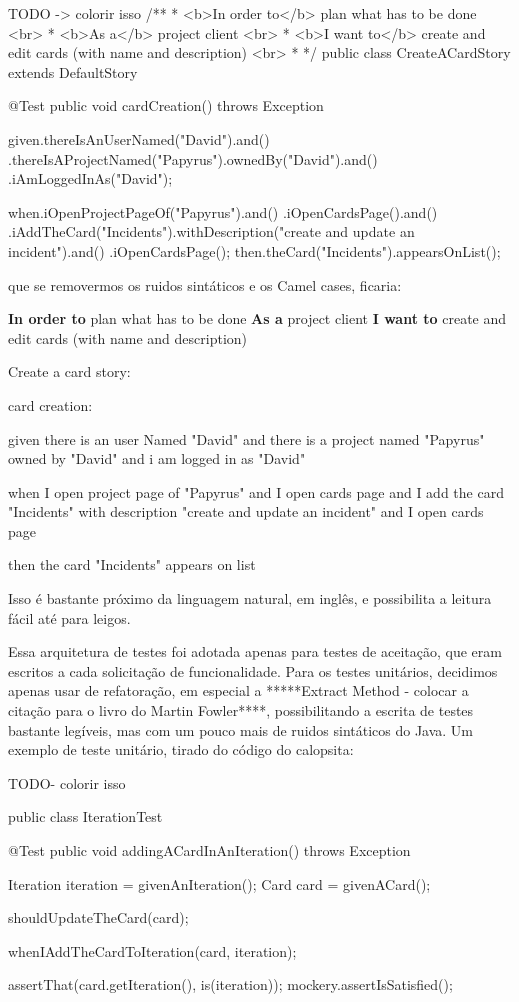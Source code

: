 TODO -> colorir isso
/**
 * <b>In order to</b> plan what has to be done <br>
 * <b>As a</b> project client <br>
 * <b>I want to</b> create and edit cards (with name and description) <br>
 *
 */
public class CreateACardStory extends DefaultStory {

	@Test
	public void cardCreation() throws Exception {
		given.thereIsAnUserNamed("David").and()
			.thereIsAProjectNamed("Papyrus").ownedBy("David").and()
			.iAmLoggedInAs("David");

		when.iOpenProjectPageOf("Papyrus").and()
		    .iOpenCardsPage().and()
			.iAddTheCard("Incidents").withDescription("create and update an incident").and()
			.iOpenCardsPage();
		then.theCard("Incidents").appearsOnList();
	}
}

que se removermos os ruidos sintáticos e os Camel cases, ficaria:

{\bf In order to} plan what has to be done
{\bf As a} project client
{\bf I want to} create and edit cards (with name and description)

Create a card story:

card creation:
	
		given there is an user Named "David" and
			there is a project named "Papyrus" owned by "David" and
			i am logged in as "David"

		when I open project page of "Papyrus" and
		  I open cards page and
			I add the card "Incidents" with description "create and update an incident" and
			I open cards page
			
		then the card "Incidents" appears on list

Isso é bastante próximo da linguagem natural, em inglês, e possibilita a leitura fácil até para leigos.

Essa arquitetura de testes foi adotada apenas para testes de aceitação, que eram escritos a cada solicitação de
funcionalidade. Para os testes unitários, decidimos apenas usar de refatoração, em especial a 
*****Extract Method - colocar a citação para o livro do Martin Fowler****, possibilitando a escrita de testes bastante
legíveis, mas com um pouco mais de ruidos sintáticos do Java. Um exemplo de teste unitário, tirado do código do calopsita:

TODO- colorir isso

public class IterationTest {
	@Test
	public void addingACardInAnIteration() throws Exception {
		Iteration iteration = givenAnIteration();
		Card card = givenACard();

		shouldUpdateTheCard(card);

		whenIAddTheCardToIteration(card, iteration);

		assertThat(card.getIteration(), is(iteration));
		mockery.assertIsSatisfied();
	}
}

